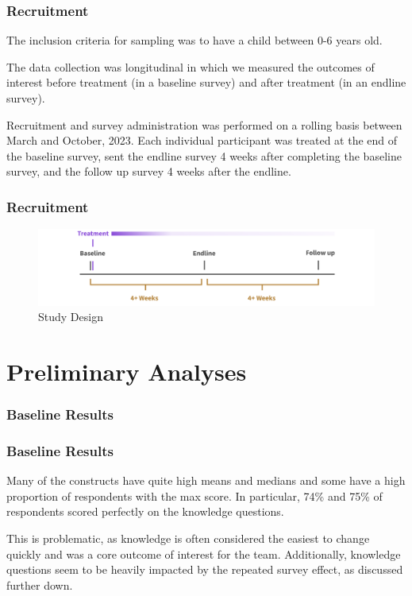 \documentclass[aspectratio=169]{beamer}
\begin{document}
\begin{frame}
  \frametitle{Recruitment}

The inclusion criteria for sampling was to have a child between 0-6 years old. 

The data collection was longitudinal in which we measured the outcomes of interest before treatment (in a baseline survey) and after treatment (in an endline survey). 

Recruitment and survey administration was performed on a rolling basis between March and October, 2023. Each individual participant was treated at the end of the baseline survey, sent the endline survey 4 weeks after completing the baseline survey, and the follow up survey 4 weeks after the endline.

\end{frame}


\begin{frame}
  \frametitle{Recruitment}


  \begin{figure}[H]
\includegraphics[width=\textwidth]{../images/design-timeline.png}
\caption{Study Design}
\label{fig:Study Design}
\end{figure}

\end{frame}

\section{Preliminary Analyses}

\begin{frame}[shrink=10]
  \frametitle{Baseline Results}

  

\end{frame}


\begin{frame}
    \frametitle{Baseline Results}

  Many of the constructs have quite high means and medians and some have a high proportion of respondents with the max score. In particular, 74\% and 75\% of respondents scored perfectly on the knowledge questions. 

This is problematic, as knowledge is often considered the easiest to change quickly and was a core outcome of interest for the team. Additionally, knowledge questions seem to be heavily impacted by the repeated survey effect, as discussed further down. 
\end{frame}
\end{document}
